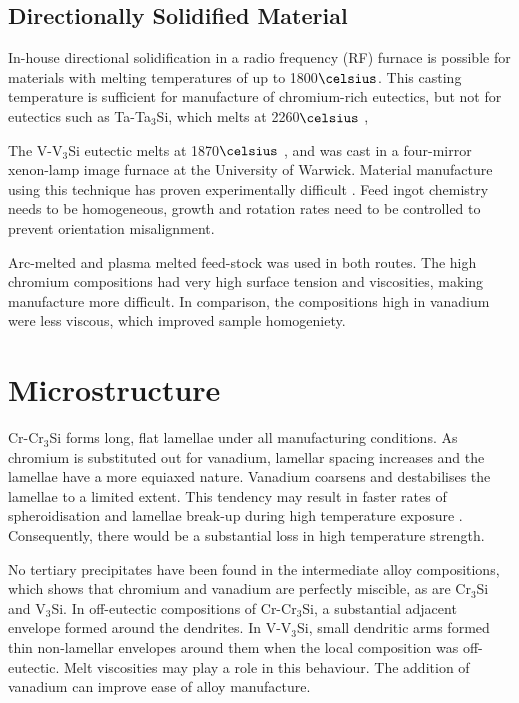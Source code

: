 \documentclass[preprint]{elsarticle}
\begin{document}
\subsection{Directionally Solidified Material}

In-house directional solidification in a radio frequency (RF) furnace is possible for materials with melting temperatures of up to 1800$\celsius$. This casting temperature is sufficient for manufacture of chromium-rich eutectics, but not for eutectics such as Ta-Ta$_3$Si, which melts at 2260$\celsius$  \cite{schlesinger94}, 

The V-V$_3$Si eutectic melts at 1870$\celsius$ , and was cast in a four-mirror xenon-lamp image furnace at the University of Warwick. Material manufacture using this technique has proven experimentally difficult \cite{shah92,bei03}. Feed ingot chemistry needs to be homogeneous, growth and rotation rates need to be controlled to prevent orientation misalignment. 

Arc-melted and plasma melted feed-stock was used in both routes. The high chromium compositions had very high surface tension and viscosities, making manufacture more difficult. In comparison, the compositions high in vanadium were less viscous, which improved sample homogeniety.


\section{Microstructure}

Cr-Cr$_3$Si forms long, flat lamellae under all manufacturing conditions. As chromium is substituted out for vanadium, lamellar spacing increases and the lamellae have a more equiaxed nature. Vanadium coarsens and destabilises the lamellae to a limited extent. This tendency may result in faster rates of spheroidisation and lamellae break-up during high temperature exposure \cite{english63}. Consequently, there would be a substantial loss in high temperature strength.


No tertiary precipitates have been found in the intermediate alloy compositions, which shows that chromium and vanadium are perfectly miscible, as are Cr$_3$Si and V$_3$Si. 
In off-eutectic compositions of Cr-Cr$_3$Si, a substantial adjacent envelope formed around the dendrites. In V-V$_3$Si, small dendritic arms formed thin non-lamellar envelopes around them when the local composition was off-eutectic. Melt viscosities may play a role in this behaviour. The addition of vanadium can improve ease of alloy manufacture. 
\end{document}
